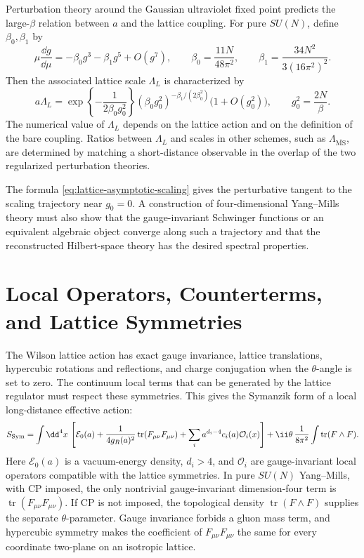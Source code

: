 Perturbation theory around the Gaussian ultraviolet fixed point predicts the
large-\(\beta\) relation between \(a\) and the lattice coupling.  For pure
\(SU(N)\), define \(\beta_0,\beta_1\) by
\begin{equation}
  \mu\frac{\dd g}{\dd\mu}
  =
  -\beta_0 g^3-\beta_1 g^5+O(g^7),
  \qquad
  \beta_0=\frac{11N}{48\pi^2},
  \qquad
  \beta_1=\frac{34N^2}{3(16\pi^2)^2}.
  \label{eq:lattice-pure-ym-beta-coefficients}
\end{equation}
Then the associated lattice scale \(\Lambda_L\) is characterized by
\begin{equation}
  a\Lambda_L
  =
  \exp\left\{-\frac{1}{2\beta_0g_0^2}\right\}
  (\beta_0g_0^2)^{-\beta_1/(2\beta_0^2)}
  \bigl(1+O(g_0^2)\bigr),
  \qquad
  g_0^2=\frac{2N}{\beta}.
  \label{eq:lattice-asymptotic-scaling}
\end{equation}
The numerical value of \(\Lambda_L\) depends on the lattice action and on the
definition of the bare coupling.  Ratios between \(\Lambda_L\) and scales in
other schemes, such as \(\Lambda_{\overline{\mathrm{MS}}}\), are determined by
matching a short-distance observable in the overlap of the two regularized
perturbation theories.

The formula \eqref{eq:lattice-asymptotic-scaling} gives the perturbative
tangent to the scaling trajectory near \(g_0=0\).  A construction of
four-dimensional Yang--Mills theory must also show that the gauge-invariant
Schwinger functions or an equivalent algebraic object converge along such a
trajectory and that the reconstructed Hilbert-space theory has the desired
spectral properties.

\section{Local Operators, Counterterms, and Lattice Symmetries}

The Wilson lattice action has exact gauge invariance, lattice translations,
hypercubic rotations and reflections, and charge conjugation when the
\(\theta\)-angle is set to zero.  The continuum local terms that can be
generated by the lattice regulator must respect these symmetries.  This gives
the Symanzik form of a local long-distance effective action:
\begin{equation}
  S_{\rm Sym}
  =
  \int \dd^4x\,
  \left[
    \mathcal E_0(a)
    +
    \frac{1}{4g_R(a)^2}
    \operatorname{tr}(F_{\mu\nu}F_{\mu\nu})
    +
    \sum_i a^{d_i-4}c_i(a)\mathcal O_i(x)
  \right]
  +
  \ii\theta\,\frac{1}{8\pi^2}\int\operatorname{tr}(F\wedge F).
  \label{eq:lattice-symanzik-effective-action}
\end{equation}
Here \(\mathcal E_0(a)\) is a vacuum-energy density, \(d_i>4\), and
\(\mathcal O_i\) are gauge-invariant local operators compatible with the
lattice symmetries.  In pure \(SU(N)\) Yang--Mills, with CP imposed, the only
nontrivial gauge-invariant dimension-four term is
\(\operatorname{tr}(F_{\mu\nu}F_{\mu\nu})\).  If CP is not imposed, the
topological density \(\operatorname{tr}(F\wedge F)\) supplies the separate
\(\theta\)-parameter.  Gauge invariance forbids a gluon mass term, and
hypercubic symmetry makes the coefficient of \(F_{\mu\nu}F_{\mu\nu}\) the same
for every coordinate two-plane on an isotropic lattice.

